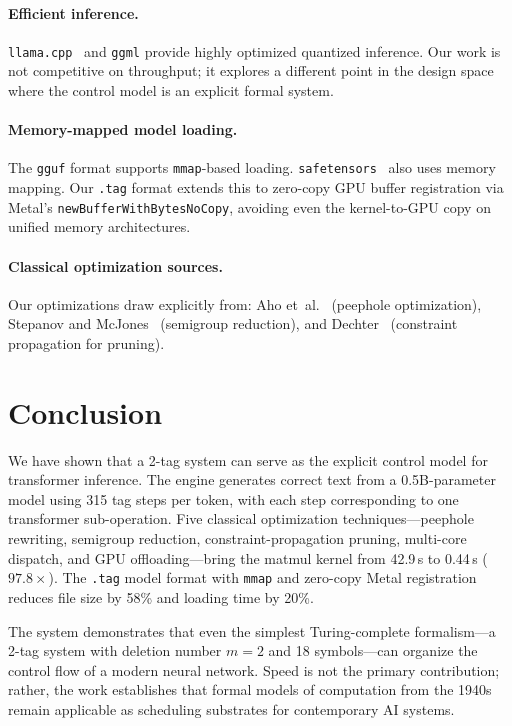 \documentclass[acmsmall,nonacm]{acmart}
\begin{document}
\paragraph{Efficient inference.}
\texttt{llama.cpp}~\cite{llamacpp} and \texttt{ggml} provide
highly optimized quantized inference.  Our work is not competitive
on throughput; it explores a different point in the design space
where the control model is an explicit formal system.

\paragraph{Memory-mapped model loading.}
The \texttt{gguf} format supports \texttt{mmap}-based loading.
\texttt{safetensors}~\cite{safetensors} also uses memory mapping.
Our \texttt{.tag} format extends this to zero-copy GPU buffer
registration via Metal's \texttt{newBufferWithBytesNoCopy}, avoiding
even the kernel-to-GPU copy on unified memory architectures.

\paragraph{Classical optimization sources.}
Our optimizations draw explicitly from:
Aho et~al.~\cite{dragonbook} (peephole optimization),
Stepanov and McJones~\cite{stepanov2009} (semigroup reduction),
and Dechter~\cite{dechter} (constraint propagation for pruning).


\section{Conclusion}
\label{sec:conclusion}

We have shown that a 2-tag system can serve as the explicit control
model for transformer inference.  The engine generates correct text
from a 0.5B-parameter model using 315 tag steps per token, with
each step corresponding to one transformer sub-operation.  Five
classical optimization techniques---peephole rewriting, semigroup
reduction, constraint-propagation pruning, multi-core dispatch,
and GPU offloading---bring the matmul kernel from 42.9\,s to
0.44\,s ($97.8\times$).  The \texttt{.tag} model format with
\texttt{mmap} and zero-copy Metal registration reduces file size
by 58\% and loading time by 20\%.

The system demonstrates that even the simplest Turing-complete
formalism---a 2-tag system with deletion number $m=2$ and 18
symbols---can organize the control flow of a modern neural network.
Speed is not the primary contribution; rather, the work establishes
that formal models of computation from the 1940s remain applicable
as scheduling substrates for contemporary AI systems.
\end{document}
